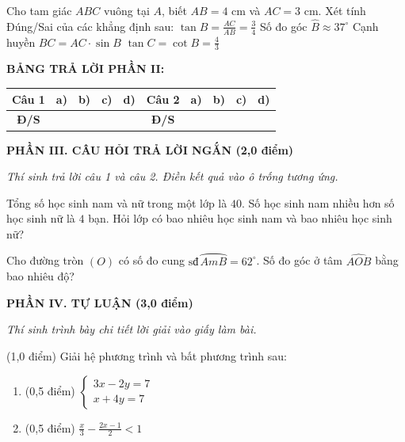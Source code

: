 \documentclass[12pt,a4paper]{article}
\begin{document}
\begin{ex}
Cho tam giác $ABC$ vuông tại $A$, biết $AB = 4\text{ cm}$ và $AC = 3\text{ cm}$. Xét tính Đúng/Sai của các khẳng định sau:
\choiceTF
{\True $\tan B = \frac{AC}{AB} = \frac{3}{4}$}
{\True Số đo góc $\widehat{B} \approx 37^\circ$}
{Cạnh huyền $BC = AC \cdot \sin B$}
{\True $\tan C = \cot B = \frac{4}{3}$}
\end{ex}


\noindent\textbf{BẢNG TRẢ LỜI PHẦN II:}
\begin{center}
\begin{tabular}{|c|c|c|c|c||c|c|c|c|c|}
\hline
\textbf{Câu 1} & \textbf{a)} & \textbf{b)} & \textbf{c)} & \textbf{d)} & \textbf{Câu 2} & \textbf{a)} & \textbf{b)} & \textbf{c)} & \textbf{d)} \\
\hline
\textbf{Đ/S} & \rule{0pt}{0.6cm} & & & & \textbf{Đ/S} & & & & \\
\hline
\end{tabular}
\end{center}
\vspace{2mm}

\setcounter{ex}{0}
\noindent\textbf{\large PHẦN III. CÂU HỎI TRẢ LỜI NGẮN (2,0 điểm)}

\textit{Thí sinh trả lời câu 1 và câu 2. Điền kết quả vào ô trống tương ứng.}

\vspace{1mm}
\begin{ex}
Tổng số học sinh nam và nữ trong một lớp là $40$. Số học sinh nam nhiều hơn số học sinh nữ là $4$ bạn. Hỏi lớp có bao nhiêu học sinh nam và bao nhiêu học sinh nữ? 
\end{ex}

\begin{ex}
Cho đường tròn $(O)$ có số đo cung $\text{sđ}\, \wideparen{AmB} = 62^\circ$. Số đo góc ở tâm $\widehat{AOB}$ bằng bao nhiêu độ? 
\end{ex}


\setcounter{ex}{0}
\noindent\textbf{\large PHẦN IV. TỰ LUẬN (3,0 điểm)}

\textit{Thí sinh trình bày chi tiết lời giải vào giấy làm bài.}

\vspace{1mm}
\begin{ex} (1,0 điểm)
Giải hệ phương trình và bất phương trình sau:
\begin{enumerate}[label=\textbf{\alph*)}, leftmargin=0.8cm, itemsep=2pt]
\item (0,5 điểm) $\begin{cases} 3x - 2y = 7 \\ x + 4y = 7 \end{cases}$
\item (0,5 điểm) $\frac{x}{3} - \frac{2x - 1}{2} < 1$
\end{enumerate}
\end{ex}
\vspace{0.5mm}
\end{document}
